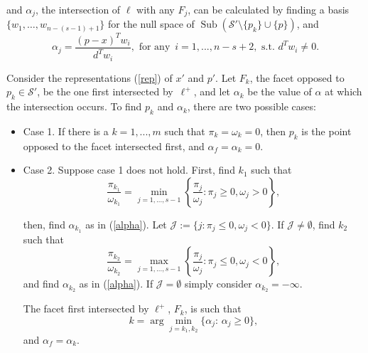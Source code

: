 \noindent and $\alpha_j$, the intersection of $\ell$ with any $F_j$, can be calculated by finding a basis $\{w_1,\dots,w_{n-(s-1)+1}\}$ for the null space of ${\operatorname{Sub}}({\mathcal{S}}'\setminus\{p_k\}\cup\{{{p}}\})$, and
\begin{equation}\label{alpha}
\alpha_j = \frac{({{p}}-x)^Tw_i}{d^Tw_i},\text{ for any }\, i=1,...,n-s+2, \text{ s.t. } d^Tw_i\neq 0.
\end{equation}
	
\smallskip 

\begin{theorem}\label{theo:main}
	
	Consider the representations (\ref{rep}) of $x'$ and $p'$. Let $F_k$, the facet opposed to $p_k\in{\mathcal{S}}'$, be the one first intersected by~$\ell^+$, and let $\alpha_k$ be the value of $\alpha$ at which the intersection occurs. To find $p_k$ and $\alpha_k$, there are two possible cases:
	\begin{itemize}
		\item {Case 1.} If there is a $k=1,...,m$ such that $\pi_k=\omega_k=0$, then $p_k$ is the point opposed to the facet intersected first, and $\alpha_f=\alpha_k=0$.
		\smallskip
		\item{Case 2.} Suppose case 1 does not hold. First, find ${k_1}$ such that
		\begin{equation}\label{pk1}
		\frac{\pi_{k_1}}{\omega_{k_1}} = \min_{j=1,...,s-1} \left\{\frac{\pi_j}{\omega_j}: \pi_j\geq 0, \omega_j>0\right\},
		\end{equation}
		
		\noindent then, find $\alpha_{k_1}$ as in (\ref{alpha}). Let ${\mathcal{J}}:=\{j: \pi_j\leq 0, \omega_j<0\}$. If ${\mathcal{J}}\neq\emptyset$,  find ${k_2}$ such that
		\begin{equation}\label{pk2}
		\frac{\pi_{k_2}}{\omega_{k_2}} = 
		\max_{j=1,...,s-1} \left\{\frac{\pi_j}{\omega_j}: \pi_j\leq 0, \omega_j<0\right\} ,
		\end{equation}
		\noindent and find $\alpha_{k_2}$ as in (\ref{alpha}). If ${\mathcal{J}}=\emptyset$ simply consider $\alpha_{k_2}=-\infty$.
		
		\noindent The facet first intersected by $\ell^+$, $F_k$, is such that
		$$k=\arg\min_{j=k_1, k_2}\{\alpha_j:\,\alpha_j\geq 0\},$$
		\noindent  and $\alpha_f=\alpha_k$.
	\end{itemize}
\end{theorem}
	
